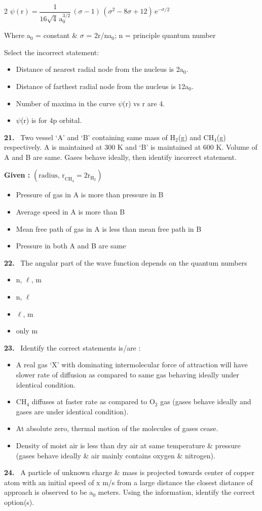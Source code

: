 \documentclass[10pt]{extarticle}
\newcommand{\qn}[1]{\par\smallskip\noindent\textbf{#1.}~}
\newenvironment{qoptions}{\begin{itemize}[leftmargin=1.8em,itemsep=1pt,topsep=2pt,label={}]}{\end{itemize}}
\newcommand{\opt}[2]{\item[(#1)] #2}
\begin{document}
\begin{multicols}{2}
$\psi(\mathrm r)=\dfrac1{16\sqrt4\,\mathrm a_0^{3/2}}\,(\sigma-1)\,(\sigma^2-8\sigma+12)\,\mathrm e^{-\sigma/2}$\par
Where a$_0$ = constant \& $\sigma$ = 2r/na$_0$; n = principle quantum number\par
Select the incorrect statement:
\begin{qoptions}
\opt{A}{Distance of nearest radial node from the nucleus is 2a$_0$.}
\opt{B}{Distance of farthest radial node from the nucleus is 12a$_0$.}
\opt{C}{Number of maxima in the curve $\psi$(r) vs r are 4.}
\opt{D}{$\psi$(r) is for 4p orbital.}
\end{qoptions}
\qn{21} Two vessel `A' and `B' containing same mass of H$_2$(g) and CH$_4$(g) respectively. A is maintained at 300 K and `B' is maintained at 600 K. Volume of A and B are same. Gases behave ideally, then identify incorrect statement.\par
\textbf{Given :} $\left(\text{radius, r}_{\mathrm{CH}_4}=2\mathrm r_{\mathrm H_2}\right)$
\begin{qoptions}
\opt{A}{Pressure of gas in A is more than pressure in B}
\opt{B}{Average speed in A is more than B}
\opt{C}{Mean free path of gas in A is less than mean free path in B}
\opt{D}{Pressure in both A and B are same}
\end{qoptions}
\qn{22} The angular part of the wave function depends on the quantum numbers
\begin{qoptions}
\opt{A}{n, $\ell$, m}
\opt{B}{n, $\ell$}
\opt{C}{$\ell$, m}
\opt{D}{only m}
\end{qoptions}
\qn{23} Identify the correct statements is/are :
\begin{qoptions}
\opt{A}{A real gas `X' with dominating intermolecular force of attraction will have slower rate of diffusion as compared to same gas behaving ideally under identical condition.}
\opt{B}{CH$_4$ diffuses at faster rate as compared to O$_2$ gas (gases behave ideally and gases are under identical condition).}
\opt{C}{At absolute zero, thermal motion of the molecules of gases cease.}
\opt{D}{Density of moist air is less than dry air at same temperature \& pressure (gases behave ideally \& air mainly contains oxygen \& nitrogen).}
\end{qoptions}
\qn{24} A particle of unknown charge \& mass is projected towards center of copper atom with an initial speed of x m/s from a large distance the closest distance of approach is observed to be a$_0$ meters. Using the information, identify the correct option(s).\par

\end{multicols}
\end{document}
